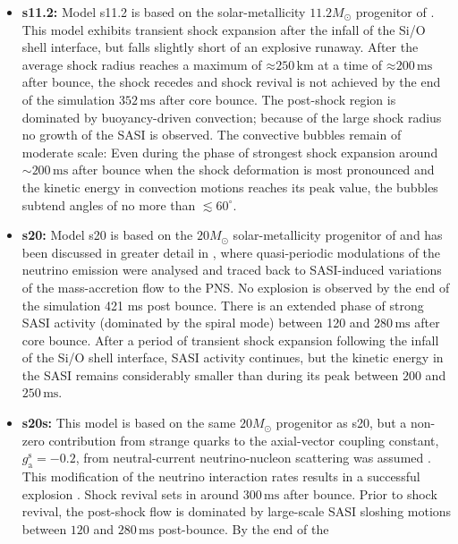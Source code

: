 \begin{itemize}
\item \textbf{s11.2:} 
Model s11.2 \citep{tamborra_14a} is based on the solar-metallicity $11.2 M_\odot$ progenitor of \citet{woosley_02}. 
This model exhibits transient shock expansion after
the infall of the Si/O shell interface, but falls slightly short of
an explosive runaway.  After the average shock radius reaches
a maximum of $\mathord{\approx} 250 \, \mathrm{km}$ at a time
of $\mathord{\approx} 200 \, \mathrm{ms}$ after bounce, the shock recedes 
and shock revival is not achieved by the end of the simulation $352 \, \mathrm{ms}$ after core bounce.
The post-shock region is dominated by buoyancy-driven convection; because of the large shock radius
no growth of the SASI is observed. The convective bubbles remain of moderate
scale: Even during the phase of strongest shock expansion around
$\mathord{\sim} 200 \, \mathrm{ms}$ after bounce when the shock deformation
is most pronounced and the kinetic energy in convection motions reaches
its peak value, the bubbles subtend
angles of no more than $\lesssim 60^\circ$.
\item \textbf{s20:}
Model s20 is based on the $20 M_{\odot}$  solar-metallicity progenitor
of \citet{woosley_07} and has been discussed in greater
detail in \citet{tamborra_13,tamborra_14b}, where quasi-periodic modulations of the neutrino
emission were analysed and traced back to SASI-induced variations of the mass-accretion flow to the PNS. 
No explosion is observed by the end of the simulation 421 ms post bounce.
There is an extended phase of strong SASI activity (dominated by the spiral mode) 
between 120 and $280 \, \mathrm{ms}$ after core bounce. After a period
of transient shock expansion following the infall of the Si/O shell
interface, SASI activity continues,
but the kinetic energy in the SASI remains considerably
smaller than during its peak between $200$ and $250 \, \mathrm{ms}$.
\item \textbf{s20s:} This model is based on the same $20 M_\odot$
progenitor as s20, but a non-zero contribution from
strange quarks to the axial-vector coupling constant,
$g_\mathrm{a}^\mathrm{s}=-0.2$, from neutral-current neutrino-nucleon scattering was assumed \citep{melson_15b}.
This modification of the neutrino interaction rates results in a successful
explosion \citep{melson_15b}. Shock revival sets in around $300 \, \mathrm{ms}$ after bounce.
Prior to shock revival, the post-shock
flow is dominated by large-scale SASI sloshing motions between
$120$ and $280 \, \mathrm{ms}$ post-bounce. By the end of the

\end{itemize}
